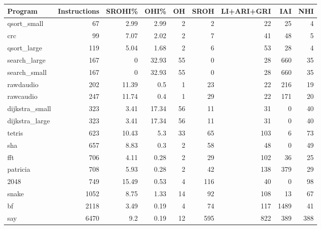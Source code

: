 \begin{tabular}{lrrrrrrrr}
\hline
 Program        &   Instructions &   SROHI\% &   OHI\% &   OH &   SROH &   LI+ARI+GRI &   IAI &   NHI \\
\hline
 qsort\_small    &             67 &     2.99 &   2.99 &    2 &      2 &           22 &    25 &     4 \\
 crc            &             99 &     7.07 &   2.02 &    2 &      7 &           41 &    48 &     5 \\
 qsort\_large    &            119 &     5.04 &   1.68 &    2 &      6 &           53 &    28 &     4 \\
 search\_large   &            167 &     0    &  32.93 &   55 &      0 &           28 &   660 &    35 \\
 search\_small   &            167 &     0    &  32.93 &   55 &      0 &           28 &   660 &    35 \\
 rawdaudio      &            202 &    11.39 &   0.5  &    1 &     23 &           22 &   216 &    19 \\
 rawcaudio      &            247 &    11.74 &   0.4  &    1 &     29 &           22 &   171 &    20 \\
 dijkstra\_small &            323 &     3.41 &  17.34 &   56 &     11 &           31 &     0 &    40 \\
 dijkstra\_large &            323 &     3.41 &  17.34 &   56 &     11 &           31 &     0 &    40 \\
 tetris         &            623 &    10.43 &   5.3  &   33 &     65 &          103 &     6 &    73 \\
 sha            &            657 &     8.83 &   0.3  &    2 &     58 &           48 &     0 &    49 \\
 fft            &            706 &     4.11 &   0.28 &    2 &     29 &          102 &    36 &    25 \\
 patricia       &            708 &     5.93 &   0.28 &    2 &     42 &          138 &   379 &    29 \\
 2048           &            749 &    15.49 &   0.53 &    4 &    116 &           40 &     0 &    98 \\
 snake          &           1052 &     8.75 &   1.33 &   14 &     92 &          108 &    13 &    67 \\
 bf             &           2118 &     3.49 &   0.19 &    4 &     74 &          117 &  1489 &    41 \\
 say            &           6470 &     9.2  &   0.19 &   12 &    595 &          822 &   389 &   388 \\

\end{tabular}
